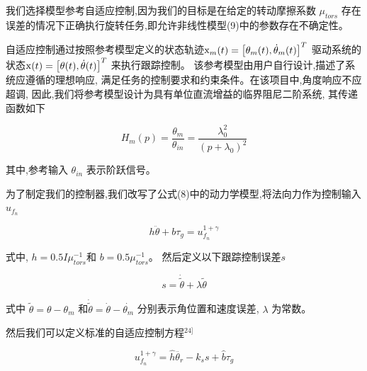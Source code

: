 
我们选择模型参考自适应控制,因为我们的目标是在给定的转动摩擦系数 $\mu_{tors}$
存在误差的情况下正确执行旋转任务,即允许非线性模型(9)中的参数存在不确定性。

自适应控制通过按照参考模型定义的状态轨迹${{\mathop{\rm x}\nolimits} _m}(t) = {\left[ {{\theta _m}(t),{{\dot \theta }_m}(t)} \right]^T}$
驱动系统的状态${\mathop{\rm x}\nolimits} (t) = {\left[ {\theta (t),\dot \theta (t)} \right]^T}$
来执行跟踪控制。
该参考模型由用户自行设计,描述了系统应遵循的理想响应,
满足任务的控制要求和约束条件。在该项目中,角度响应不应超调,
因此,我们将参考模型设计为具有单位直流增益的临界阻尼二阶系统,
其传递函数如下

\vspace{-15pt}
\begin{equation}
  {H_m}(p) = \frac{{{\theta _m}}}{{{\theta _{in}}}} = \frac{{\lambda _0^2}}{{{{\left( {p + {\lambda _0}} \right)}^2}}}
\end{equation}

\noindent 其中,参考输入 $\theta_{in}$ 表示阶跃信号。

为了制定我们的控制器,我们改写了公式(8)中的动力学模型,将法向力作为控制输入 $u_{f_n}$

\vspace{-15pt}
\begin{equation}
  h\ddot {\theta}  + b{\tau _g} = u_{{f_n}}^{1 + \gamma }
\end{equation}

\noindent 式中, $h = 0.5I\mu _{tors}^{ - 1}$和 $b = 0.5\mu _{tors}^{ - 1}$。
然后定义以下跟踪控制误差$s$

\vspace{-15pt}
\begin{equation}
  s = \dot {\tilde \theta}  + \lambda \tilde \theta
\end{equation}

\noindent 式中 $\tilde \theta  = \theta  - {\theta _m}$ 和$\dot {\tilde \theta}  = \dot {\theta}  - {\dot {\theta _m}}$
分别表示角位置和速度误差, $\lambda$ 为常数。

然后我们可以定义标准的自适应控制方程$^{24]}$

\vspace{-15pt}
\begin{equation}
  u_{{f_n}}^{1 + \gamma } = \hat h{\ddot {\theta _r}} - {k_s}s + \hat b{\tau _g}
\end{equation}


